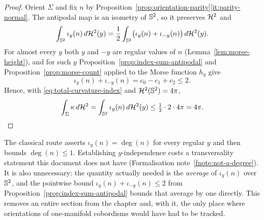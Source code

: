 \begin{proof}
Orient $\Sigma$ and fix $n$ by
Proposition~\ref{prop:orientation-parity}\ref{it:parity-normal}.  The
antipodal map is an isometry of $\mathbb S^2$, so it preserves $\mathcal H^2$ and
\[
  \int_{\mathbb S^2}\iota_y(n)\,d\mathcal H^2(y)
  =\frac12\int_{\mathbb S^2}\bigl(\iota_y(n)+\iota_{-y}(n)\bigr)\,d\mathcal H^2(y).
\]
For almost every $y$ both $y$ and $-y$ are regular values of $n$
(Lemma~\ref{lem:morse-height}), and for such $y$
Proposition~\ref{prop:index-sum-antipodal} and
Proposition~\ref{prop:morse-count} applied to the Morse function $h_y$ give
\[
  \iota_y(n)+\iota_{-y}(n)=c_0-c_1+c_2\le2 .
\]
Hence, with \eqref{eq:total-curvature-index} and
$\mathcal H^2(\mathbb S^2)=4\pi$,
\[
  \int_\Sigma\kappa\,d\mathcal H^2
  =\int_{\mathbb S^2}\iota_y(n)\,d\mathcal H^2(y)
  \le\tfrac12\cdot2\cdot4\pi=4\pi .
\]
\end{proof}

\begin{fnote}\label{fnote:why-averaging}
The classical route asserts $\iota_y(n)=\deg(n)$ for every regular $y$ and
then bounds $\deg(n)\le1$.  Establishing $y$-independence costs a
transversality statement this document does not have
(Formalisation note~\ref{fnote:not-a-degree}).  It is also unnecessary: the
quantity actually needed is the \emph{average} of $\iota_y(n)$ over
$\mathbb S^2$, and the pointwise bound
$\iota_y(n)+\iota_{-y}(n)\le2$ from
Proposition~\ref{prop:index-sum-antipodal} bounds that average by one
directly.  This removes an entire section from the chapter and, with it, the
only place where orientations of one-manifold cobordisms would have had to be
tracked.
\end{fnote}

